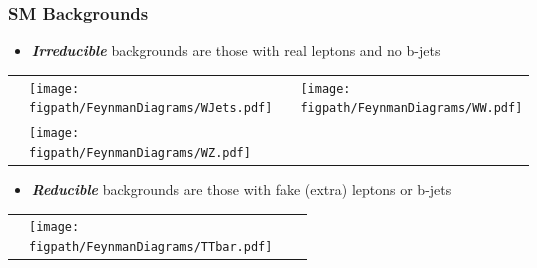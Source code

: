 \begin{frame}
	\frametitle{SM Backgrounds}
	\vspace*{-0.24cm}
	\begin{itemize}
		\item \textit{\textbf{Irreducible}} backgrounds are those with real leptons and no b-jets
	\end{itemize}
	\vspace*{-0.2cm}
	\begin{table}[tb]
		\centering
		\begin{tabular}{>{\centering}m{} >{\centering}m{} | >{\centering}m{} >{\centering\arraybackslash}m{}}
			\Wjets & \texttt{[image: \\figpath/FeynmanDiagrams/WJets.pdf]} & \WW & \texttt{[image: \\figpath/FeynmanDiagrams/WW.pdf]} \\
			\WZ & \texttt{[image: \\figpath/FeynmanDiagrams/WZ.pdf]} & & \\
		\end{tabular}
	\end{table}
	\vspace*{-0.2cm}
	\begin{itemize}
		\item \textit{\textbf{Reducible}} backgrounds are those with fake (extra) leptons or b-jets
	\end{itemize}
	\vspace*{-0.2cm}
	\begin{table}[tb]
		\centering
		\begin{tabular}{>{\centering}m{} >{\centering}m{} | >{\centering}m{} >{\centering\arraybackslash}m{}}
			  \ttbar & \texttt{[image: \\figpath/FeynmanDiagrams/TTbar.pdf]} & & \\
		\end{tabular}
	\end{table}
\end{frame}

